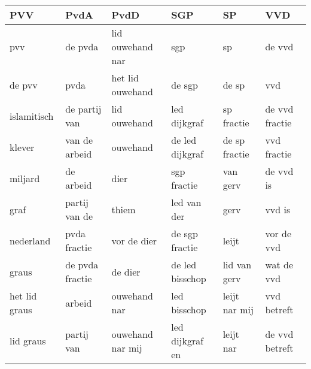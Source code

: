 \begin{tabular}{llllll}
\toprule
           PVV &             PvdA &              PvdD &              SGP &             SP &             VVD \\
\midrule
           pvv &          de pvda &  lid ouwehand nar &              sgp &             sp &          de vvd \\
        de pvv &             pvda &  het lid ouwehand &           de sgp &          de sp &             vvd \\
   islamitisch &    de partij van &      lid ouwehand &     led dijkgraf &     sp fractie &  de vvd fractie \\
        klever &    van de arbeid &          ouwehand &  de led dijkgraf &  de sp fractie &     vvd fractie \\
       miljard &        de arbeid &              dier &      sgp fractie &       van gerv &       de vvd is \\
          graf &    partij van de &             thiem &      led van der &           gerv &          vvd is \\
     nederland &     pvda fractie &       vor de dier &   de sgp fractie &          leijt &      vor de vvd \\
         graus &  de pvda fractie &           de dier &  de led bisschop &   lid van gerv &      wat de vvd \\
 het lid graus &           arbeid &      ouwehand nar &     led bisschop &  leijt nar mij &     vvd betreft \\
     lid graus &       partij van &  ouwehand nar mij &  led dijkgraf en &      leijt nar &  de vvd betreft \\
\bottomrule
\end{tabular}
